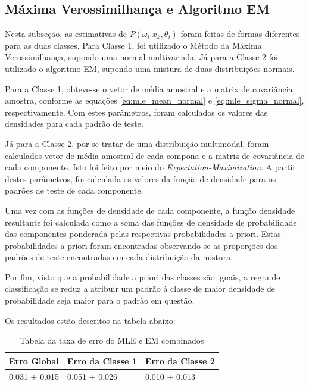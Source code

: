 \subsection{Máxima Verossimilhança e Algoritmo EM}
\label{subsec:exp-mle-em}

Nesta subseção, as estimativas de $P(\omega_i | x_k, \theta_i)$ foram feitas de formas diferentes para as duas classes. Para Classe 1, foi utilizado o Método da Máxima Verossimilhança, supondo uma normal multivariada. Já para a Classe 2 foi utilizado o algoritmo EM, supondo uma mistura de duas distribuições normais.

Para a Classe 1, obteve-se o vetor de média amostral e a matrix de covariância amostra, conforme as equações \ref{eq:mle_mean_normal} e \ref{eq:mle_sigma_normal}, respectivamente. Com estes parâmetros, foram calculados os valores das densidades para cada padrão de teste.

Já para a Classe 2, por se tratar de uma distribuição multimodal, foram calculados vetor de média amostral de cada compona e a matriz de covariância de cada componente. Isto foi feito por meio do \textit{Expectation-Maximization}. A partir destes parâmetros, foi calculada os valores da função de densidade para os padrões de teste de cada componente.

Uma vez com as funções de densidade de cada componente, a função densidade resultante foi calculada como a soma das funções de densidade de probabilidade das componentes ponderada pelas respectivas probabilidades a priori. Estas probabilidades a priori foram encontradas observando-se as proporções dos padrões de teste encontradas em cada distribuição da mistura.

Por fim, visto que a probabilidade a priori das classes são iguais, a regra de classificação se reduz a atribuir um padrão à classe de maior densidade de probabilidade seja maior para o padrão em questão.

Os resultados estão descritos na tabela abaixo:

\begin{table}[H]
\begin{center}
\begin{tabular}{|l|l|l|}
\hline
Erro Global			&	Erro da Classe 1	&	Erro da Classe 2	\\
\hline %
0.031 $\pm$ 0.015	&	0.051 $\pm$ 0.026	&	0.010 $\pm$ 0.013	\\
\hline
\end{tabular}%
\end{center}   %
\caption{Tabela da taxa de erro do MLE e EM combinados}
\label{tab:erro-mle-em}
\end{table}


